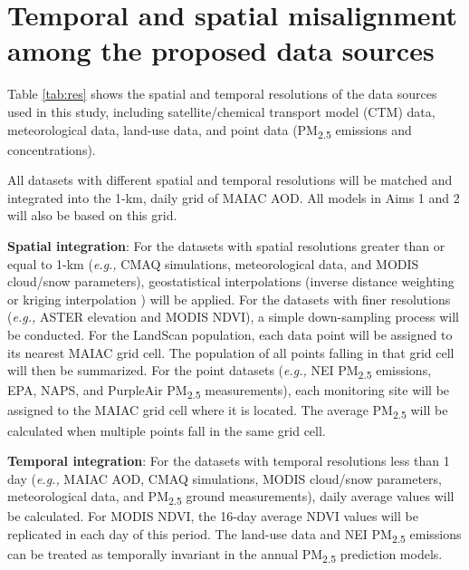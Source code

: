 \documentclass[11pt]{article}
\newcommand{\tsub}{\textsubscript}
\begin{document}
\section{Temporal and spatial misalignment among the proposed data sources}
\begin{enumerate*}[{[a)]}]
    \item Table \ref{tab:res} shows the spatial and temporal resolutions of the data sources used in this study, including satellite/chemical transport model (CTM) data, meteorological data, land-use data, and point data (PM\tsub{2.5} emissions and concentrations). 
    \item All datasets with different spatial and temporal resolutions will be matched and integrated into the 1-km, daily grid of MAIAC AOD. All models in Aims 1 and 2 will also be based on this grid. {
        \begin{itemize*}
            \item \textbf{Spatial integration}: For the datasets with spatial resolutions greater than or equal to 1-km (\textit{e.g.,} CMAQ simulations, meteorological data, and MODIS cloud/snow parameters), geostatistical interpolations (inverse distance weighting \citep{bartier1996multivariate} or kriging interpolation \citep{oliver1990kriging}) will be applied. For the datasets with finer resolutions (\textit{e.g.,} ASTER elevation and MODIS NDVI), a simple down-sampling process will be conducted. For the LandScan population, each data point will be assigned to its nearest MAIAC grid cell. The population of all points falling in that grid cell will then be summarized. For the point datasets (\textit{e.g.,} NEI PM\tsub{2.5} emissions, EPA, NAPS, and PurpleAir PM\tsub{2.5} measurements), each monitoring site will be assigned to the MAIAC grid cell where it is located. The average PM\tsub{2.5} will be calculated when multiple points fall in the same grid cell. 
            \item \textbf{Temporal integration}: For the datasets with temporal resolutions less than 1 day (\textit{e.g.,} MAIAC AOD, CMAQ simulations, MODIS cloud/snow parameters, meteorological data, and PM\tsub{2.5} ground measurements), daily average values will be calculated. For MODIS NDVI, the 16-day average NDVI values will be replicated in each day of this period. The land-use data and NEI PM\tsub{2.5} emissions can be treated as temporally invariant in the annual PM\tsub{2.5} prediction models. 
        \end{itemize*}
}
\end{enumerate*}
\end{document}
